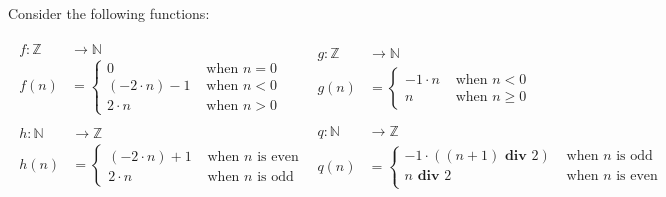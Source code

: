 
Consider the following functions:

\[
\begin{array}{l|l}
\begin{array}{ll}
f : \mathbb{Z} &\to \mathbb{N} \\
f(n) & = \begin{cases}
  0 & \textrm{ when } n = 0 \\
  (-2 \cdot n) - 1 & \textrm{ when } n < 0 \\
  2 \cdot n & \textrm{ when } n > 0
\end{cases}
\end{array}
&
\begin{array}{ll}
g : \mathbb{Z} &\to \mathbb{N} \\
g(n) & = \begin{cases}
  -1 \cdot n & \textrm{ when } n < 0 \\
  n & \textrm{ when } n \geq 0
\end{cases}
\end{array} \\
\hline

\begin{array}{ll}
h : \mathbb{N} &\to \mathbb{Z} \\
h(n) & = \begin{cases}
  (-2 \cdot n) + 1 & \textrm{ when } n \textrm{ is even } \\
  2 \cdot n & \textrm{ when } n \textrm{ is odd }
\end{cases}
\end{array}
&
\begin{array}{ll}
q : \mathbb{N} &\to \mathbb{Z} \\
q(n) & = \begin{cases}
  -1 \cdot ((n + 1) \textbf{ div } 2) & \textrm{ when } n \textrm{ is odd} \\
  n \textbf{ div } 2 & \textrm{ when } n \textrm{ is even} \\
\end{cases}
\end{array} \\
\end{array}
\]

